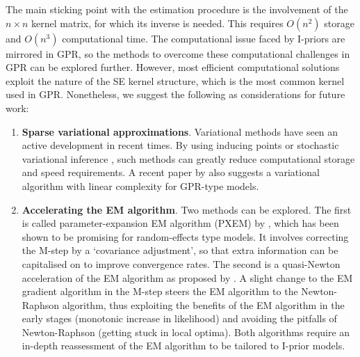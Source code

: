\documentclass[showframe,11pt,twoside,openright]{report}
\begin{document}
The main sticking point with the estimation procedure is the involvement of the $n\times n$ kernel matrix, for which its inverse is needed.
This requires $O(n^2)$ storage and $O(n^3)$ computational time.
The computational issue faced by I-priors are mirrored in GPR, so the methods to overcome these computational challenges in GPR can be explored further.
However, most efficient computational solutions exploit the nature of the SE kernel structure, which is the most common kernel used in GPR.
Nonetheless, we suggest the following as considerations for future work:
\begin{enumerate}
  \item \textbf{Sparse variational approximations}.  Variational methods have seen an active development in recent times. By using inducing points \citep{titsias2009variational} or stochastic variational inference \citep{hensman2013gaussian}, such methods can greatly reduce computational storage and speed requirements. A recent paper by \citet{cheng2017variational} also suggests a variational algorithm with linear complexity for GPR-type models.
  \item \textbf{Accelerating the EM algorithm}.  Two methods can be explored. The first is called parameter-expansion EM algorithm (PXEM) by \citet{liu1998parameter}, which has been shown to be promising for random-effects type models. It involves correcting the M-step by a `covariance adjustment', so that extra information can be capitalised on to improve convergence rates. The second is a quasi-Newton acceleration of the EM algorithm as proposed by \citet{lange1995quasi}. A slight change to the EM gradient algorithm in the M-step steers the EM algorithm to the Newton-Raphson algorithm, thus exploiting the benefits of the EM algorithm in the early stages (monotonic increase in likelihood) and avoiding the pitfalls of Newton-Raphson (getting stuck in local optima). Both algorithms require an in-depth reassessment of the EM algorithm to be tailored to I-prior models.
\end{enumerate}

\hClosingStuffStandalone
\end{document}
